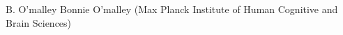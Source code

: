 
                {B.  O'malley}
                {Bonnie O'malley (Max Planck Institute of Human Cognitive and Brain Sciences)}
                